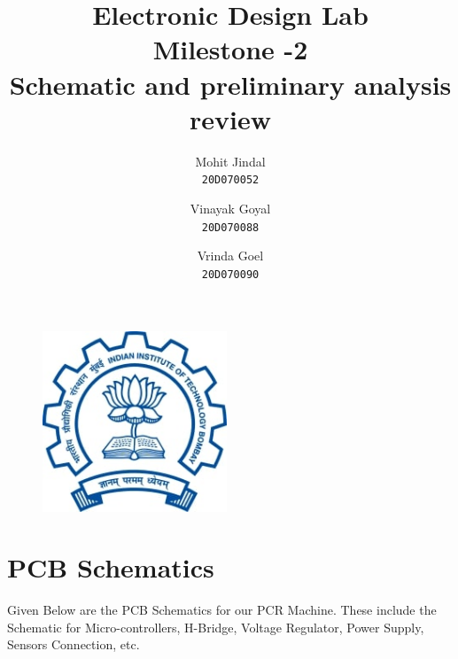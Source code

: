 \documentclass{article}
\begin{document}
\begin{figure}
\centering
\includegraphics[width=5.5cm,scale=2.5]{logo.jpg}
\label{fig:cenario}
\end{figure}
\vspace{-40pt}
\title{\textbf{Electronic Design Lab}\\
\vspace{10pt}
Milestone -2\\
\vspace{10pt}
\textbf{Schematic and preliminary analysis review}}
\author{
  Mohit Jindal \\
  \texttt{20D070052}
  \and
  Vinayak Goyal\\
  \texttt{20D070088}
  \and
  Vrinda Goel\\
  \texttt{20D070090}
}


\maketitle
\newpage



\newpage
\maketitle

\section{PCB Schematics}

Given Below are the PCB Schematics for our PCR Machine. These include the Schematic for Micro-controllers, H-Bridge, Voltage Regulator, Power Supply, Sensors Connection, etc.\\
\end{document}
